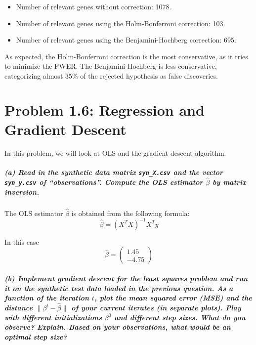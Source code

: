 \documentclass[11pt, english]{article}
\begin{document}
\begin{itemize}
	\item Number of relevant genes without correction: 1078.

	\item Number of relevant genes using the Holm-Bonferroni correction: 103.

	\item Number of relevant genes using the Benjamini-Hochberg correction: 695.
\end{itemize}

As expected, the Holm-Bonferroni correction is the most conservative, as
it tries to minimize the FWER. The Benjamini-Hochberg is less
conservative, categorizing almost 35\% of the rejected hypothesis as
false discoveries.

\newpage
    \hypertarget{problem-1.6-regression-and-gradient-descent}{%
\section*{\texorpdfstring{\textbf{Problem 1.6:} Regression and
Gradient
Descent}{Problem 1.6: Regression and Gradient Descent}}\label{problem-1.6-regression-and-gradient-descent}}

In this problem, we will look at OLS and the gradient descent algorithm.

    \hypertarget{a-read-in-the-synthetic-data-matrix-syn_x.csv-and-the-vector-syn_y.csv-of-observations.-compute-the-ols-estimator-hatbeta-by-matrix-inversion.}{%
\subparagraph{\texorpdfstring{(a) Read in the synthetic data matrix
\texttt{syn\_X.csv} and the vector \texttt{syn\_y.csv} of
``observations''. Compute the OLS estimator \(\hat{\beta}\) by matrix
inversion.\\[2ex]}{(a) Read in the synthetic data matrix syn\_X.csv and the vector syn\_y.csv of ``observations''. Compute the OLS estimator \textbackslash hat\{\textbackslash beta\} by matrix inversion.}}\label{a-read-in-the-synthetic-data-matrix-syn_x.csv-and-the-vector-syn_y.csv-of-observations.-compute-the-ols-estimator-hatbeta-by-matrix-inversion.}}

    The OLS estimator \(\hat{\beta}\) is obtained from the following
formula: 
	\[\hat{\beta} = \left(X^T X \right)^{-1} X^T y\]

In this case
	\[\hat{\beta} = \begin{pmatrix} 1.45 \\ -4.75\end{pmatrix}\]

\subparagraph{(b) Implement gradient descent for the least squares problem and run it on the synthetic test data loaded in the previous question. As a function of the iteration $t$, plot the mean squared error (MSE) and the distance $\|\beta^{t} - \hat{\beta}\|$ of your current iterates (in separate plots). Play with different initializations $\beta^{0}$ and different step sizes. What do you observe? Explain. Based on your observations, what would be an optimal step size?\\[2ex]}
\end{document}
